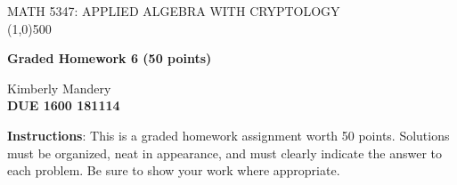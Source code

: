 \documentclass[12pt]{article}
\begin{document}
              

\begin{centering}
	
	MATH 5347: APPLIED ALGEBRA WITH CRYPTOLOGY\\

 \line(1,0){500}

\end{centering}

	\par\vspace{3mm}

\begin{centering}
	{\bf Graded Homework 6 (50 points)}
	\par\vspace{1mm}
    Kimberly Mandery\\
	{\bf DUE 1600 181114}

\end{centering}

\vspace{3mm}
{\bf Instructions}: This is a graded homework assignment worth 50 points.  Solutions must be organized, neat in appearance, and must clearly indicate the answer to each problem.  Be sure to show your work where appropriate.  

\vspace{5mm}
\end{document}
